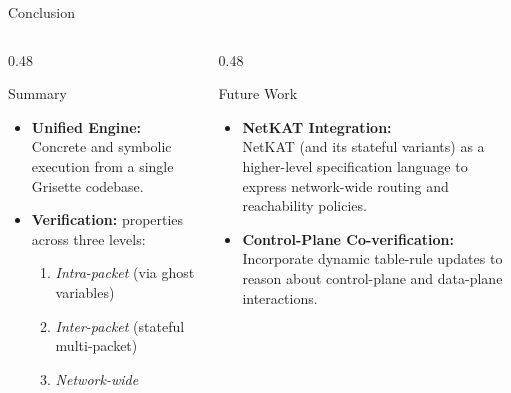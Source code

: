 \documentclass[aspectratio=169]{beamer}
\begin{document}
\begin{hidden}

\begin{frame}{Conclusion}
  \begin{columns}[T]
    
    \begin{column}{0.48\textwidth}
      \begin{block}{Summary}
        \small
        \begin{itemize}\setlength\itemsep{6pt}
          \item \textbf{Unified Engine:} Concrete and symbolic execution from a single Grisette codebase.
          \item \textbf{ Verification:} properties across three levels:
          \begin{enumerate}\setlength\itemsep{2pt}
              \item \textit{Intra-packet} (via ghost variables)
              \item \textit{Inter-packet} (stateful multi-packet)
              \item \textit{Network-wide}
          \end{enumerate}
        \end{itemize}
      \end{block}
    \end{column}
    
    \begin{column}{0.48\textwidth}
      \begin{block}{Future Work}
        \small
        \begin{itemize}\setlength\itemsep{8pt}
          \item \textbf{NetKAT Integration:}\\
                NetKAT (and its stateful variants) as a higher-level specification language to express network-wide routing and reachability policies.
          \item \textbf{Control-Plane Co-verification:}\\
                Incorporate dynamic table-rule updates to reason about control-plane and data-plane interactions.
        \end{itemize}
      \end{block}
    \end{column}
    

\end{columns}
\end{frame}
\end{hidden}
\end{document}
